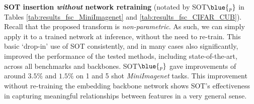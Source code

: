 \vspace{3pt}\noindent\textbf{SOT insertion \textit{without} network retraining}
(notated by SOT$\blue{_\textit{p}}$ in Tables \ref{tab:results_fsc_MiniImagenet} and \ref{tab:results_fsc_CIFAR_CUB}).
Recall that the proposed transform is \textit{non-parametric}. As such, we can simply apply it to a trained network at inference, without the need to re-train. This basic `drop-in' use of SOT consistently, and in many cases also significantly, improved the performance of the tested methods, including state-of-the-art, across all benchmarks and backbones. 
SOT$\blue{_\textit{p}}$ gave improvements of around $3.5\%$ and $1.5\%$ on 1 and 5 shot \emph{MiniImagenet} tasks. 
This improvement without re-training the embedding backbone network shows SOT's effectiveness in capturing meaningful relationships between features in a very general sense. 



\newcommand{\bbbbb}[1]{{\footnotesize ({\color{blue} #1})}}
\newcommand{\rrrrr}[1]{({\footnotesize \color{red} #1})}
\newcommand{\foot}[1]{{\footnotesize #1}}

